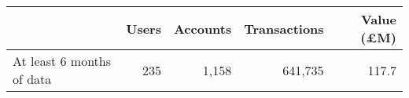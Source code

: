 \begin{tabular}{lrrrr}
\toprule
                          & Users & Accounts & Transactions & Value (\pounds M) \\
\midrule
At least 6 months of data &   235 &    1,158 &      641,735 &             117.7 \\
\bottomrule
\end{tabular}
